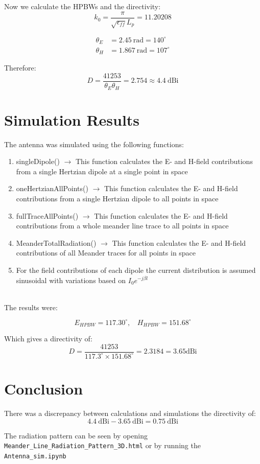 \documentclass[a4paper,12pt]{article}
\begin{document}
Now we calculate the HPBWs and the directivity:
\[
k_0 = \frac{\pi}{\sqrt{\epsilon_{ff}}L_p} = 11.20208
\]

\begin{align*}
\theta_E &= 2.45~\text{rad} = 140^\circ \\
\theta_H &= 1.867~\text{rad} = 107^\circ
\end{align*}

Therefore:
\[
D = \frac{41253}{\theta_E \theta_H} = 2.754 \approx 4.4~\text{dBi}
\]

\section*{Simulation Results}
The antenna was simulated using the following functions: \\
\begin{enumerate}
  \item singleDipole() $\rightarrow$ This function calculates the E- and H-field contributions from a single Hertzian dipole at a single point in space
  \item oneHertzianAllPoints() $\rightarrow$ This function calculates the E- and H-field contributions from a single Hertzian dipole to all points in space
  \item fullTraceAllPoints() $\rightarrow$ This function calculates the E- and H-field contributions from a whole meander line trace to all points in space
  \item MeanderTotalRadiation() $\rightarrow$ This function calculates the E- and H-field contributions of all Meander traces for all points in space
  \item For the field contributions of each dipole the current distribution is assumed sinusoidal with variations based on $I_0 e^{-j\beta l}$
\end{enumerate} \\

The results were:

$$
E_{HPBW} = 117.30^{\circ}, ~~~~ H_{HPBW} = 151.68^{\circ}
$$

Which gives a directivity of:
$$
D = \frac{41253}{117.3^{\circ}\times 151.68^{\circ}} = 2.3184 = 3.65 \text{dBi}
$$


\section*{Conclusion}
There was a discrepancy between calculations and simulations the directivity of:
$$
4.4~\text{dBi} - 3.65~\text{dBi} = 0.75~\text{dBi}
$$

\noindent The radiation pattern can be seen by opening \texttt{Meander\_Line\_Radiation\_Pattern\_3D.html} or by running the \texttt{Antenna\_sim.ipynb}
\end{document}
